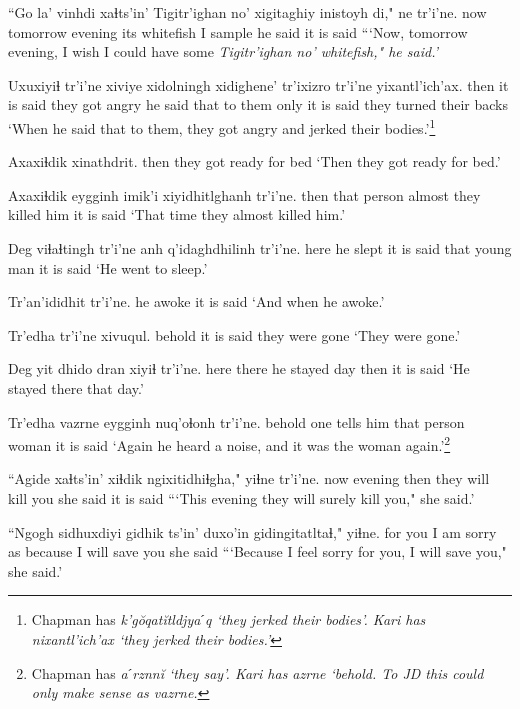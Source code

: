 \documentclass[12pt]{article}
\begin{document}
\gll ``Go la' vinhdi xaɬts'in' {Tigitr'ighan no'} xigitaghiy inistoyh di," ne  tr'i'ne.
now {} tomorrow evening {} {its whitefish} {I sample} {} {he said}  {it is said}
\glt ```Now, tomorrow evening, I wish I could have some \em Tigitr'ighan no' \em whitefish," he said.'
\glend

\gll Uxuxiyiɬ tr'i'ne {xiviye xidolningh} xidighene'  tr'ixizro tr'i'ne yixantl'ich'ax.
then  {it is said} {they got angry} {he said that to them} only  {it is said} {they turned their backs}
\glt `When he said that to them, they got angry and jerked their bodies.'\footnote{Chapman has \em k'g\u{o}qat\u{i}tldjyaˊq \em `they jerked their bodies'. Kari has \em nixantl'ich'ax \em `they jerked their bodies.'}
\glend

\gll Axaxiɬdik xinathdrit.
then  {they got ready for bed}
\glt `Then they got ready for bed.'
\glend

\gll Axaxiɬdik eygginh imik'i  xiyidhitlghanh tr'i'ne.
then  {that person} almost {they killed him} {it is said}
\glt `That time they almost killed him.'
\glend

\gll Deg viɬaɬtingh tr'i'ne anh q'idaghdhilinh tr'i'ne.
here {he slept} {it is said} that {young man} {it is said}
\glt `He went to sleep.'
\glend

\gll Tr'an'ididhit tr'i'ne.
{he awoke}  {it is said}
\glt `And when he awoke.'
\glend

\gll Tr'edha tr'i'ne xivuqul.
behold  {it is said} {they were gone}
\glt `They were gone.'
\glend

\gll Deg yit dhido  dran xiyiɬ tr'i'ne.
here there {he stayed} day then {it is said}
\glt `He stayed there that day.'
\glend

\gll Tr'edha vazrne eygginh nuq'oɬonh tr'i'ne.
behold  {one tells him} {that person} woman  {it is said}
\glt `Again he heard a noise, and it was the woman again.'\footnote{Chapman has \em aˊrznn\u{i} \em `they say'. Kari has azrne \em `behold. To JD this could only make sense as \em vazrne.}
\glend

\gll ``Agide xaɬts'in' xiɬdik ngixitidhiɬgha," yiɬne  tr'i'ne.
now  evening then {they will kill you} {she said} {it is said}
\glt ```This evening they will surely kill you," she said.'
\glend

\gll ``Ngogh {sidhuxdiyi gidhik} ts'in' duxo'in gidingitatltaɬ," yiɬne.
{for you} {I am sorry}  as because {I will save you} {she said}
\glt ```Because I feel sorry for you, I will save you," she said.'
\glend
\end{document}

